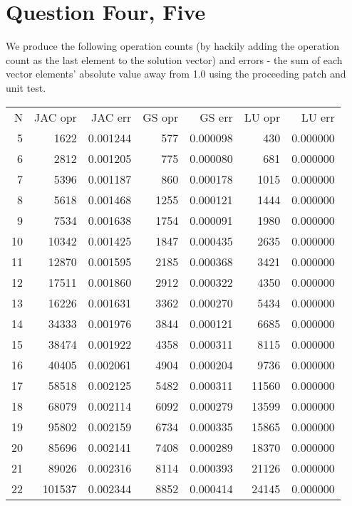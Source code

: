 \documentclass[11pt]{article}
\begin{document}
\section{Question Four, Five}
\label{sec:org22b52a9}
We produce the following operation counts (by hackily adding the operation count as the last element
to the solution vector) and errors - the sum of each vector elements' absolute value away from 1.0
using the proceeding patch and unit test.

\begin{center}
\begin{tabular}{rrrrrrr}
N & JAC opr & JAC err & GS opr & GS err & LU opr & LU err\\[0pt]
5 & 1622 & 0.001244 & 577 & 0.000098 & 430 & 0.000000\\[0pt]
6 & 2812 & 0.001205 & 775 & 0.000080 & 681 & 0.000000\\[0pt]
7 & 5396 & 0.001187 & 860 & 0.000178 & 1015 & 0.000000\\[0pt]
8 & 5618 & 0.001468 & 1255 & 0.000121 & 1444 & 0.000000\\[0pt]
9 & 7534 & 0.001638 & 1754 & 0.000091 & 1980 & 0.000000\\[0pt]
10 & 10342 & 0.001425 & 1847 & 0.000435 & 2635 & 0.000000\\[0pt]
11 & 12870 & 0.001595 & 2185 & 0.000368 & 3421 & 0.000000\\[0pt]
12 & 17511 & 0.001860 & 2912 & 0.000322 & 4350 & 0.000000\\[0pt]
13 & 16226 & 0.001631 & 3362 & 0.000270 & 5434 & 0.000000\\[0pt]
14 & 34333 & 0.001976 & 3844 & 0.000121 & 6685 & 0.000000\\[0pt]
15 & 38474 & 0.001922 & 4358 & 0.000311 & 8115 & 0.000000\\[0pt]
16 & 40405 & 0.002061 & 4904 & 0.000204 & 9736 & 0.000000\\[0pt]
17 & 58518 & 0.002125 & 5482 & 0.000311 & 11560 & 0.000000\\[0pt]
18 & 68079 & 0.002114 & 6092 & 0.000279 & 13599 & 0.000000\\[0pt]
19 & 95802 & 0.002159 & 6734 & 0.000335 & 15865 & 0.000000\\[0pt]
20 & 85696 & 0.002141 & 7408 & 0.000289 & 18370 & 0.000000\\[0pt]
21 & 89026 & 0.002316 & 8114 & 0.000393 & 21126 & 0.000000\\[0pt]
22 & 101537 & 0.002344 & 8852 & 0.000414 & 24145 & 0.000000\\[0pt]

\end{tabular}
\end{center}
\end{document}
